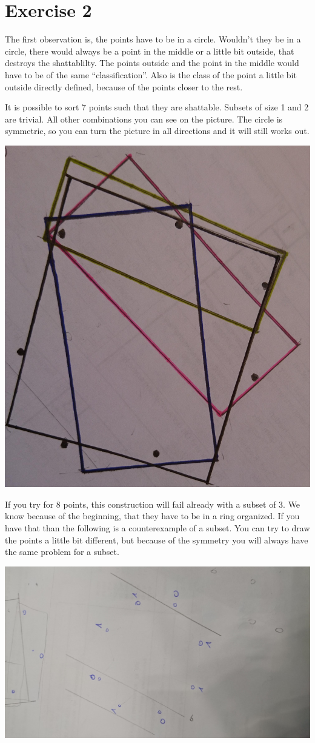 \documentclass{article}
\begin{document}
\section*{Exercise 2}
The first observation is, the points have to be in a circle. Wouldn't they be in
a circle, there would always be a point in the middle or a little bit outside,
that destroys the shattablilty. The points outside and the point in the middle would have to be of
the same ``classification''. Also is the class of the point a little bit outside
directly defined, because of the points closer to the rest.

It is possible to sort 7 points such that they are shattable. Subsets of size 1
and 2 are trivial. All other combinations you can see on the picture. The circle
is symmetric, so you can turn the picture in all directions and it will still
works out.

\includegraphics[width=.6\linewidth]{2.jpg}

If you try for 8 points, this construction will fail already with a subset of 3.
We know because of the beginning, that they have to be in a ring organized. If you
have that than the following is a counterexample of a subset. You can try to
draw the points a little bit different, but because of the symmetry you will
always have the same problem for a subset. 

\includegraphics[width=.6\linewidth]{22.jpg}
\end{document}
